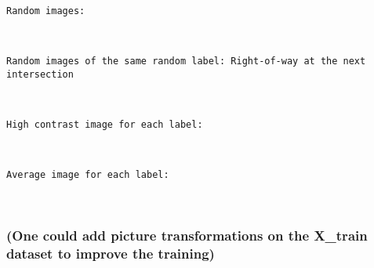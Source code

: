 \documentclass[11pt]{article}
\begin{document}
    \begin{Verbatim}[commandchars=\\\{\}]
Random images:

    \end{Verbatim}

    \begin{center}
    \end{center}
    { \hspace*{\fill} \\}
    
    \begin{Verbatim}[commandchars=\\\{\}]
Random images of the same random label: Right-of-way at the next intersection

    \end{Verbatim}

    \begin{center}
    \end{center}
    { \hspace*{\fill} \\}
    
    \begin{Verbatim}[commandchars=\\\{\}]
High contrast image for each label:

    \end{Verbatim}

    \begin{center}
    \end{center}
    { \hspace*{\fill} \\}
    
    \begin{Verbatim}[commandchars=\\\{\}]
Average image for each label:

    \end{Verbatim}

    \begin{center}
    \end{center}
    { \hspace*{\fill} \\}
    
    \subsubsection{(One could add picture transformations on the X\_train
dataset to improve the
training)}\label{one-could-add-picture-transformations-on-the-x_train-dataset-to-improve-the-training}
\end{document}
